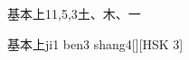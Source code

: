 \begin{entry}{基本上}{11,5,3}{⼟、⽊、⼀}
  \begin{phonetics}{基本上}{ji1 ben3 shang4}[][HSK 3]
  \end{phonetics}
\end{entry}

